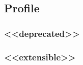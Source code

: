 \subsection{Profile} \label{sec:Profile}

\subsubsection{<<deprecated>>}
  \label{sec:deprecated}




\FloatBarrier

\subsubsection{<<extensible>>}
  \label{sec:extensible}




\FloatBarrier
